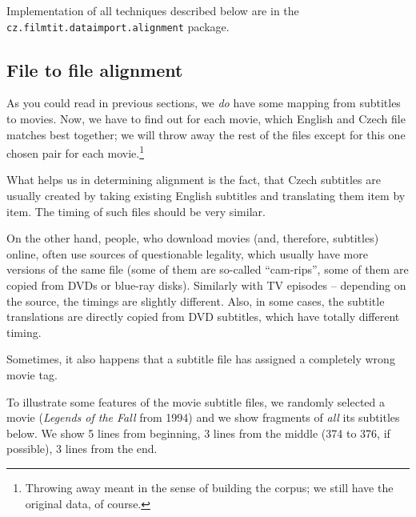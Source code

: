 Implementation of all techniques described below are in the \texttt{cz.filmtit.dataimport.alignment} package.

\subsection{File to file alignment}

As you could read in previous sections, we \emph{do} have some mapping from subtitles to movies. Now, we have to find out for each movie, which English and Czech file matches best together; we will throw away the rest of the files except for this one chosen pair for each movie.\footnote{Throwing away meant in the sense of building the corpus; we still have the original data, of course.}

What helps us in determining alignment is the fact, that Czech subtitles are usually created by taking existing English subtitles and translating them item by item. The timing of such files should be very similar. 

On the other hand, people, who download movies (and, therefore, subtitles) online, often use sources of questionable legality, which usually have more versions of the same file (some of them are so-called ``cam-rips'', some of them are copied from DVDs or blue-ray disks). Similarly with TV episodes -- depending on the source, the timings are slightly different. Also, in some cases, the subtitle translations are directly copied from DVD subtitles, which have totally different timing.

Sometimes, it also happens that a subtitle file has assigned a completely wrong movie tag.

To illustrate some features of the movie subtitle files, we randomly selected a movie (\emph{Legends of the Fall} from 1994) and we show fragments of \emph{all} its subtitles below. We show 5 lines from beginning, 3 lines from the middle (374 to 376, if possible), 3 lines from the end.

\label{subtitledump}

\newcommand{\nicesubs}[4]{
\noindent
\begin{boxedminipage}{\textwidth}
\begin{minipage}[b]{0.24\textwidth}\footnotesize\smaller[2]{\tt
#1
}\end{minipage}
\begin{minipage}[b]{0.24\textwidth}\footnotesize\smaller[2]{\tt
#2
}\end{minipage}
\begin{minipage}[b]{0.24\textwidth}\footnotesize\smaller[2]{\tt
#3
}\end{minipage}
\begin{minipage}[b]{0.24\textwidth}\footnotesize\smaller[2]{\tt
#4
}\end{minipage}
\end{boxedminipage}
}


